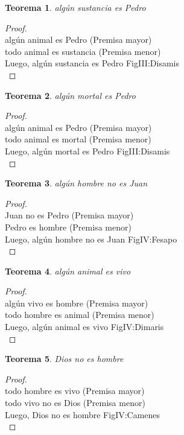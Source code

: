 ﻿\documentclass[12pt]{book}
\newtheorem{theorem}{Teorema}[chapter]
\newtheorem{proof}{Demostración}
\begin{document}
\begin{theorem}
algún sustancia es Pedro
\label{th: 72}
\end{theorem}\begin{proof}\\algún animal es Pedro	 (Premisa mayor) \\todo animal es sustancia	 (Premisa menor) \\Luego, algún sustancia es Pedro	FigIII:Disamis \\ \end{proof}
\begin{theorem}
algún mortal es Pedro
\label{th: 73}
\end{theorem}\begin{proof}\\algún animal es Pedro	 (Premisa mayor) \\todo animal es mortal	 (Premisa menor) \\Luego, algún mortal es Pedro	FigIII:Disamis \\ \end{proof}
\begin{theorem}
algún hombre no es Juan
\label{th: 74}
\end{theorem}\begin{proof}\\Juan no es Pedro	 (Premisa mayor) \\Pedro es hombre	 (Premisa menor) \\Luego, algún hombre no es Juan	FigIV:Fesapo \\ \end{proof}
\begin{theorem}
algún animal es vivo
\label{th: 75}
\end{theorem}\begin{proof}\\algún vivo es hombre	 (Premisa mayor) \\todo hombre es animal	 (Premisa menor) \\Luego, algún animal es vivo	FigIV:Dimaris \\ \end{proof}
\begin{theorem}
Dios no es hombre
\label{th: 76}
\end{theorem}\begin{proof}\\todo hombre es vivo	 (Premisa mayor) \\todo vivo no es Dios	 (Premisa menor) \\Luego, Dios no es hombre	FigIV:Camenes \\ \end{proof}
\end{document}
